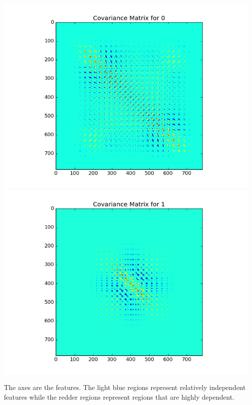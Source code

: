 \documentclass{article}
\begin{document}
\begin{enumerate}[a)]
    \includegraphics[scale=0.4]{prob5c0}
    \includegraphics[scale=0.4]{prob5c1}

    The axes are the features. The light blue regions represent relatively independent features while the redder regions represent regions that are highly dependent.


\end{enumerate}
\end{document}
